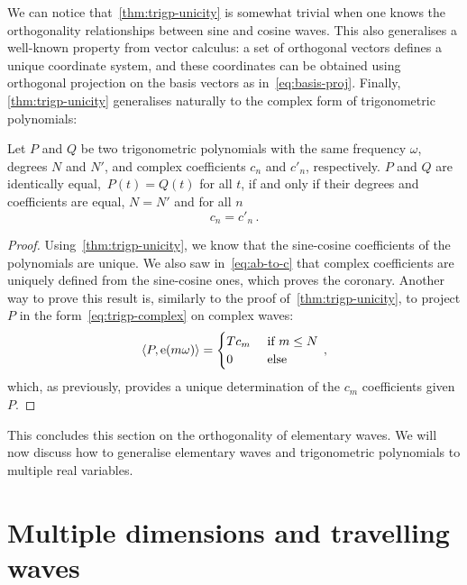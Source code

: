 We can notice that~\cref{thm:trigp-unicity} is somewhat trivial when one knows the orthogonality relationships between sine and cosine waves. This also generalises a well-known property from vector calculus: a set of orthogonal vectors defines a unique coordinate system, and these coordinates can be obtained using orthogonal projection on the basis vectors as in~\cref{eq:basis-proj}. Finally, \cref{thm:trigp-unicity} generalises naturally to the complex form of trigonometric polynomials:
\begin{corollary}
  Let $P$ and $Q$ be two trigonometric polynomials with the same frequency $\omega$, degrees $N$ and $N'$, and complex coefficients $c_n$ and $c'_n$, respectively. $P$ and $Q$ are identically equal,~\ie $P(t)=Q(t)$ for all $t$, if and only if their degrees and coefficients are equal, \ie $N=N'$ and for all $n$
  \begin{equation}
    c_n=c'_n\,.
  \end{equation}
\end{corollary}
\begin{proof}
  Using~\cref{thm:trigp-unicity}, we know that the sine-cosine coefficients of the polynomials are unique. We also saw in~\cref{eq:ab-to-c} that complex coefficients are uniquely defined from the sine-cosine ones, which proves the coronary. Another way to prove this result is, similarly to the proof of~\cref{thm:trigp-unicity}, to project $P$ in the form~\cref{eq:trigp-complex} on complex waves:
  \begin{equation}
    \braket{P,\mathrm{e}(m\omega)}=
    \begin{cases}
      T c_m&~\text{if}~m\leq N\\
      0&~\text{else}
    \end{cases}\,,
  \end{equation}
  which, as previously, provides a unique determination of the $c_m$ coefficients given $P$.
\end{proof}
This concludes this section on the orthogonality of elementary waves. We will now discuss how to generalise elementary waves and trigonometric polynomials to multiple real variables.
\section{Multiple dimensions and travelling waves}
